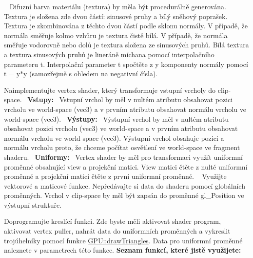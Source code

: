 \begin{DoxyRefList}
 ~\newline
 Difuzní barva materiálu (textura) by měla být procedurálně generována. Textura je složena zde dvou částí\+: sinusové pruhy a bílý sněhový poprašek. Textura je zkombinována z těchto dvou částí podle sklonu normály. V případě, že normála směřuje kolmo vzhůru je textura čistě bílá. V případě, že normála směřuje vodorovně nebo dolů je textura složena ze sinusových pruhů. Bílá textura a textura sinusových pruhů je lineráně míchana pomocí interpolačního parameteru t. Interpolační parameter t spočtěte z y komponenty normály pomocí t = y$\ast$y (samozřejmě s ohledem na negativní čísla). 
\item[\label{todo__todo000038}%
\Hypertarget{todo__todo000038}%
Global \hyperlink{group__shader__side_ga128e1d2afb1e73269e5a1d4eaf4c23cb}{phong\+\_\+\+VS} (\hyperlink{structOutVertex}{Out\+Vertex} \&out\+Vertex, \hyperlink{structInVertex}{In\+Vertex} const \&in\+Vertex, \hyperlink{structUniforms}{Uniforms} const \&uniforms)]Naimplementujte vertex shader, který transformuje vstupní vrcholy do clip-\/space.~\newline
 {\bfseries Vstupy\+:}~\newline
 Vstupní vrchol by měl v nultém atributu obsahovat pozici vrcholu ve world-\/space (vec3) a v prvním atributu obsahovat normálu vrcholu ve world-\/space (vec3).~\newline
 {\bfseries Výstupy\+:}~\newline
 Výstupní vrchol by měl v nultém atributu obsahovat pozici vrcholu (vec3) ve world-\/space a v prvním atributu obsahovat normálu vrcholu ve world-\/space (vec3). Výstupní vrchol obsahuje pozici a normálu vrcholu proto, že chceme počítat osvětlení ve world-\/space ve fragment shaderu.~\newline
 {\bfseries Uniformy\+:}~\newline
 Vertex shader by měl pro transformaci využít uniformní proměnné obsahující view a projekční matici. View matici čtěte z nulté uniformní proměnné a projekční matici čtěte z první uniformní proměnné. ~\newline
 Využijte vektorové a maticové funkce. Nepředávajte si data do shaderu pomocí globálních proměnných. Vrchol v clip-\/space by měl být zapsán do proměnné gl\+\_\+\+Position ve výstupní struktuře.  
\item[\label{todo__todo000041}%
\Hypertarget{todo__todo000041}%
Global \hyperlink{group__cpu__side_ga100e32901442800e1c155b5ce089f7c5}{Phong\+Method\+:\+:on\+Draw} (glm\+::mat4 const \&proj, glm\+::mat4 const \&view, glm\+::vec3 const \&light, glm\+::vec3 const \&camera) override]Doprogramujte kreslící funkci. Zde byste měli aktivovat shader program, aktivovat vertex puller, nahrát data do uniformních proměnných a vykreslit trojúhelníky pomocí funkce \hyperlink{group__draw__tasks_ga127436afbcbda852746dfb9dae885ecf}{G\+P\+U\+::draw\+Triangles}. Data pro uniformní proměnné naleznete v parametrech této funkce. {\bfseries Seznam funkcí, které jistě využijete\+:}

\end{DoxyRefList}
